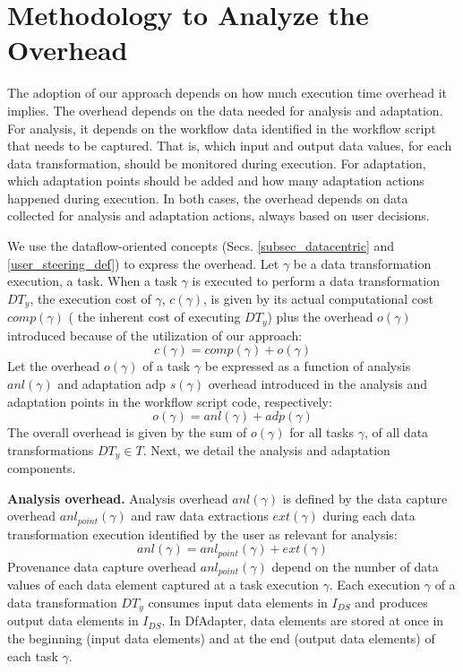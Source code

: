 \section{Methodology to Analyze the Overhead}
\label{overhead-analysis-section}

The adoption of our approach depends on how much execution time overhead it
implies. The overhead depends on the data needed for analysis and
adaptation. For analysis, it depends on the workflow data identified in
the workflow script that needs to be captured. That is, which input and
output data values, for each data transformation, should be monitored
during execution. For adaptation, which adaptation points should be added
and how many adaptation actions happened during execution. In
both cases, the overhead depends on data collected for analysis
and adaptation actions, always based on user decisions.

We use the dataflow-oriented concepts (Secs. \ref{subsec_datacentric} and \ref{user_steering_def}) to express the
overhead. Let $\gamma$ be a data transformation execution, \ie{} a task. When a task $\gamma$ is executed to perform a data
transformation $DT_y$, the execution cost of $\gamma$,
$c(\gamma)$, is given by its actual computational cost
$comp(\gamma)$ (\ie{} the inherent cost of
executing $DT_y$) plus the overhead
$o(\gamma)$ introduced because of the utilization of our approach:
\begin{equation}
\label{eq_1}
    c(\gamma) = comp(\gamma) + o(\gamma)
\end{equation}
Let the overhead $o(\gamma)$ of a
task $\gamma$ be expressed as a function of analysis
$anl(\gamma)$ and adaptation adp $s(\gamma)$ overhead introduced in the analysis and adaptation points in the workflow script code, respectively:
\begin{equation}
    o(\gamma) = anl(\gamma) + adp(\gamma)
\end{equation}
The overall overhead is given by the sum of
$o(\gamma)$ for all tasks $\gamma$, of all data
transformations $DT_{y} \in T$. Next, we detail the
analysis and adaptation components.

\textbf{Analysis overhead.}
Analysis overhead
$anl(\gamma)$ is defined by the data capture
overhead $anl_{point}(\gamma)$ and raw data extractions
$ext(\gamma)$ during each data transformation
execution identified by the user as relevant for analysis:
\begin{equation}
    anl(\gamma) = anl_{point}(\gamma) + ext(\gamma)
\end{equation}
Provenance data capture overhead $anl_{point}(\gamma)$ depend
on the number of data values of each data element captured at a task
execution $\gamma$. Each execution $\gamma$ of a data transformation
$DT_y$ consumes input data elements in $I_{DS}$ and produces output
data elements in $I_{DS}$. In DfAdapter, data elements are stored at
once in the beginning (input data elements) and at the end (output data
elements) of each task $\gamma$.

